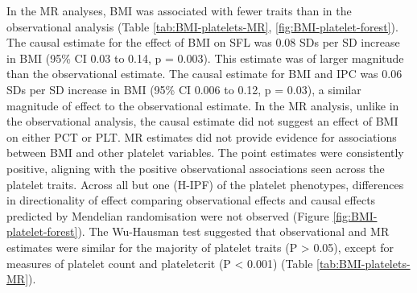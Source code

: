 \documentclass[11pt,twoside]{bristolthesis}
\begin{document}
In the MR analyses, BMI was associated with fewer traits than in the observational analysis (Table \ref{tab:BMI-platelets-MR}, \ref{fig:BMI-platelet-forest}). The causal estimate for the effect of BMI on SFL was 0.08 SDs per SD increase in BMI (95\% CI 0.03 to 0.14, p = 0.003). This estimate was of larger magnitude than the observational estimate. The causal estimate for BMI and IPC was 0.06 SDs per SD increase in BMI (95\% CI 0.006 to 0.12, p = 0.03), a similar magnitude of effect to the observational estimate. In the MR analysis, unlike in the observational analysis, the causal estimate did not suggest an effect of BMI on either PCT or PLT. MR estimates did not provide evidence for associations between BMI and other platelet variables. The point estimates were consistently positive, aligning with the positive observational associations seen across the platelet traits. Across all but one (H-IPF) of the platelet phenotypes, differences in directionality of effect comparing observational effects and causal effects predicted by Mendelian randomisation were not observed (Figure \ref{fig:BMI-platelet-forest}).
The Wu-Hausman test suggested that observational and MR estimates were similar for the majority of platelet traits (P \textgreater{} 0.05), except for measures of platelet count and plateletcrit (P \textless{} 0.001) (Table \ref{tab:BMI-platelets-MR}).
\end{document}
